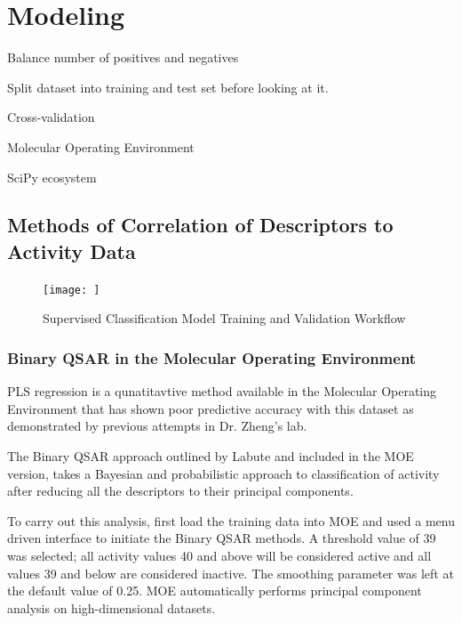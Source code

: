 \section{Modeling}
\begin{description}
\item Balance number of positives and negatives

\item Split dataset into training and test set before looking at it.

\item Cross-validation
\end{description}

\begin{description}
\item Molecular Operating Environment
\item SciPy ecosystem

\end{description}

\subsection{Methods of Correlation of Descriptors to Activity Data}

\begin{figure}[h,t]
  \caption{Supervised Classification Model Training and Validation Workflow}
  \centering
   \texttt{[image: ]}
\end{figure}

\subsubsection{Binary QSAR in the Molecular Operating Environment}
PLS regression is a qunatitavtive method available in the Molecular Operating Environment that has shown poor predictive accuracy with this dataset as demonstrated by previous attempts in Dr. Zheng's lab.

The Binary QSAR approach outlined by Labute \cite{Labute1999} and included in the MOE version, takes a Bayesian and probabilistic approach to classification of activity after reducing all the descriptors to their principal components.

To carry out this analysis, first load the training data into MOE and used a menu driven interface to initiate the Binary QSAR methods. A threshold value of 39 was selected; all activity values 40 and above will be considered active and all values 39 and below are considered inactive. The smoothing parameter was left at the default value of 0.25. MOE automatically performs principal component analysis on high-dimensional datasets.

